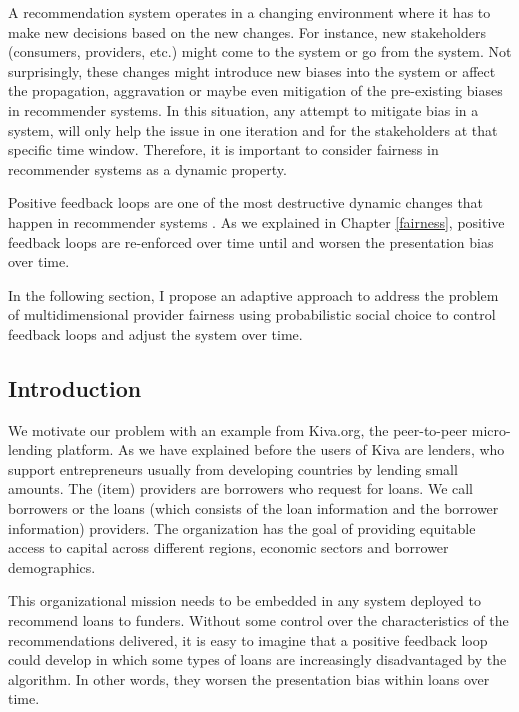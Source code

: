 \label{sec:dynamicfair}

A recommendation system operates in a changing environment where it has to make new decisions based on the new changes. For instance, new stakeholders (consumers, providers, etc.) might come to the system or go from the system. Not surprisingly, these changes might introduce new biases into the system or affect the propagation, aggravation or maybe even mitigation of the pre-existing biases in recommender systems. In this situation, any attempt to mitigate bias in a system, will only help the issue in one iteration and for the stakeholders at that specific time window. Therefore, it is important to consider fairness in recommender systems as a dynamic property.

Positive feedback loops are one of the most destructive dynamic changes that happen in recommender systems \cite{o2016weapons}. As we explained in Chapter \ref{fairness}, positive feedback loops are re-enforced over time until and worsen the presentation bias over time.

In the following section, I propose an adaptive approach to address the problem of multidimensional provider fairness using probabilistic social choice to control feedback loops and adjust the system over time.

\subsection{Introduction}
\label{subsec:dyn_intro}

We motivate our problem with an example from Kiva.org, the peer-to-peer micro-lending platform. As we have explained before the users of Kiva are lenders, who support entrepreneurs usually from developing countries by lending small amounts.
The (item) providers are borrowers who request for loans. We call borrowers or the loans (which consists of the loan information and the borrower information) providers. The organization has the goal of providing equitable access to capital across different regions, economic sectors and borrower demographics.

This organizational mission needs to be embedded in any system deployed to recommend loans to funders. Without some control over the characteristics of the recommendations delivered, it is easy to imagine that a positive feedback loop \cite{sun2019debiasing} could develop in which some types of loans are increasingly disadvantaged by the algorithm. In other words, they worsen the presentation bias within loans over time.

